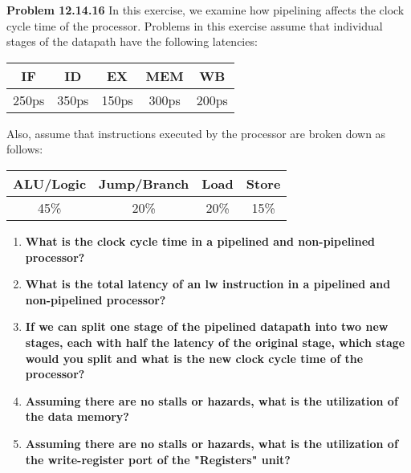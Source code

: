 \documentclass{article}
\begin{document}
    \noindent\textbf{Problem 12.14.16} In this exercise, we examine how pipelining affects the clock cycle time of the processor. Problems in this exercise assume that individual stages of the datapath have the following latencies:

    \begin{center}
        \begin{tabular}{c|c|c|c|c}
            IF & ID & EX & MEM & WB \\
            \hline
            250ps & 350ps & 150ps & 300ps & 200ps
        \end{tabular}
    \end{center}

    \noindent Also, assume that instructions executed by the processor are broken down as follows:

    \begin{center}
        \begin{tabular}{c|c|c|c}
            ALU/Logic & Jump/Branch & Load & Store \\
            \hline
            45\% & 20\% & 20\% & 15\%
        \end{tabular}
    \end{center}

    \begin{enumerate}[label=\textbf{(\alph*)}]
        \item \textbf{What is the clock cycle time in a pipelined and non-pipelined processor?}
        \item \textbf{What is the total latency of an lw instruction in a pipelined and non-pipelined processor?}
        \item \textbf{If we can split one stage of the pipelined datapath into two new stages, each with half the latency of the original stage, which stage would you split and what is the new clock cycle time of the processor?}
        \item \textbf{Assuming there are no stalls or hazards, what is the utilization of the data memory?}
        \item \textbf{Assuming there are no stalls or hazards, what is the utilization of the write-register port of the "Registers" unit?}
    \end{enumerate}
\end{document}
